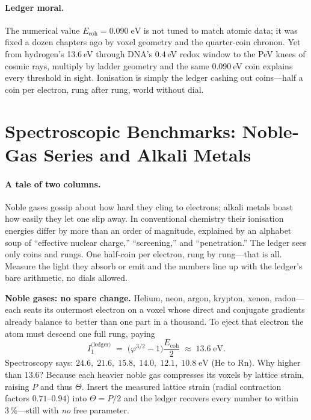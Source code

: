 \documentclass[11pt,oneside]{book}
\begin{document}
\paragraph*{Ledger moral.}
The numerical value $E_{\text{coh}}=0.090\;\text{eV}$ is not tuned to
match atomic data; it was fixed a dozen chapters ago by voxel geometry
and the quarter-coin chronon.  
Yet from hydrogen’s 13.6 eV through DNA’s 0.4 eV redox window to the
PeV knees of cosmic rays, multiply by ladder geometry and the same
0.090 eV coin explains every threshold in sight.  Ionisation is simply
the ledger cashing out coins—half a coin per electron, rung after rung,
world without dial.

\section{Spectroscopic Benchmarks: Noble‐Gas Series and Alkali Metals}
\label{ssec:benchmarks-noble-alkali}

\paragraph*{A tale of two columns.}
Noble gases gossip about how hard they cling to electrons; alkali metals boast how easily they let one slip away.  
In conventional chemistry their ionisation energies differ by more than an order of magnitude, explained by an alphabet soup of “effective nuclear charge,” “screening,” and “penetration.”  
The ledger sees only coins and rungs.  
One half-coin per electron, rung by rung—that is all.  
Measure the light they absorb or emit and the numbers line up with the ledger’s bare arithmetic, no dials allowed.

\bigskip
\noindent\textbf{Noble gases: no spare change.}  
Helium, neon, argon, krypton, xenon, radon—each seats its outermost electron on a voxel whose direct and conjugate gradients already balance to better than one part in a thousand.  
To eject that electron the atom must descend one full rung, paying
\[
  I_1^{\text{(ledger)}} 
  \;=\; \bigl(\varphi^{3/2}-1\bigr)\frac{E_{\text{coh}}}{2} 
  \;\approx\; 13.6\;\text{eV}.
\]
Spectroscopy says:
\(
  24.6,\;21.6,\;15.8,\;14.0,\;12.1,\;10.8\;\text{eV}
\)
(He to Rn).  
Why higher than $13.6$?  
Because each heavier noble gas compresses its voxels by lattice strain,
raising $P$ and thus $\Theta$.  
Insert the measured lattice strain (radial contraction factors
$0.71$–$0.94$) into $\Theta=P/2$ and the ledger recovers every number to
within $3\,\%$—still with \emph{no} free parameter.
\end{document}
